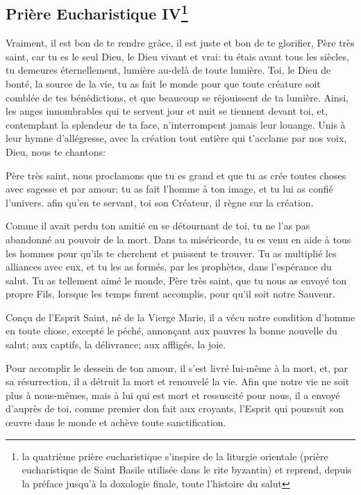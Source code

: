 \subsection{Prière Eucharistique IV\footnote{la quatrième prière eucharistique s’inspire de la liturgie orientale
(prière eucharistique de Saint Basile utilisée dans le rite byzantin) et 
reprend, depuis la préface jusqu’à la doxologie finale, toute l’histoire du salut}}\label{pe4}

Vraiment, il est bon de te rendre grâce,
il est juste et bon de te glorifier, Père très saint,
car tu es le seul Dieu, le Dieu vivant et vrai:
tu étais avant tous les siècles,
tu demeures éternellement,
lumière au-delà de toute lumière.
Toi, le Dieu de bonté, la source de la vie,
tu as fait le monde
pour que toute créature
soit comblée de tes bénédictions,
et que beaucoup se réjouissent de ta lumière.
Ainsi, les anges innombrables
qui te servent jour et nuit
se tiennent devant toi,
et, contemplant la splendeur de ta face,
n'interrompent jamais leur louange.
Unis à leur hymne d'allégresse,
avec la création tout entière
qui t'acclame par nos voix,
Dieu, nous te chantons:




Père très saint,
nous proclamons que tu es grand
et que tu as crée toutes choses
avec sagesse et par amour:
tu as fait l'homme à ton image,
et tu lui as confié l'univers.
afin qu'en te servant, toi son Créateur,
il règne sur la création.

Comme il avait perdu ton amitié
en se détournant de toi,
tu ne l'as pas abandonné au pouvoir de la mort.
Dans ta miséricorde,
tu es venu en aide à tous les hommes
pour qu'ils te cherchent et puissent te trouver.
Tu as multiplié les alliances avec eux,
et tu les as formés, par les prophètes,
dans l'espérance du salut.
Tu as tellement aimé le monde,
Père très saint,
que tu nous as envoyé ton propre Fils,
lorsque les temps furent accomplis,
pour qu'il soit notre Sauveur.

Conçu de l'Esprit Saint,
né de la Vierge Marie,
il a vécu notre condition d'homme
en toute chose, excepté le péché,
annonçant aux pauvres
la bonne nouvelle du salut;
aux captifs, la délivrance;
aux affligés, la joie.

Pour accomplir le dessein de ton amour,
il s'est livré lui-même à la mort,
et, par sa résurrection,
il a détruit la mort et renouvelé la vie.
Afin que notre vie ne soit plus à nous-mêmes,
mais à lui qui est mort et ressuscité pour nous,
il a envoyé d'auprès de toi,
comme premier don fait aux croyants,
l'Esprit qui poursuit son œuvre dans le monde
et achève toute sanctification.

